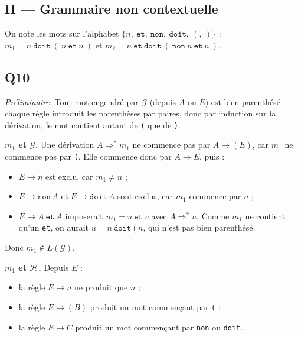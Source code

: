 \documentclass[11pt,a4paper]{article}
\providecommand{\tightlist}{\setlength{\itemsep}{0pt}\setlength{\parskip}{0pt}}
\begin{document}
\hypertarget{ii-grammaire-non-contextuelle}{%
\subsection{II --- Grammaire non contextuelle}\label{ii-grammaire-non-contextuelle}}

On note les mots sur l'alphabet \(\{n,\ \mathtt{et},\ \mathtt{non},\ \mathtt{doit},\ (,\ )\}\) : \(m_1 = n\ \mathtt{doit}\ (\ n\ \mathtt{et}\ n\ )\) et \(m_2 = n\ \mathtt{et}\ \mathtt{doit}\ (\ \mathtt{non}\ n\ \mathtt{et}\ n\ )\).

\hypertarget{q10}{%
\subsection{Q10}\label{q10}}

\emph{Préliminaire.} Tout mot engendré par \(\mathcal G\) (depuis \(A\) ou \(E\)) est bien parenthésé : chaque règle introduit les parenthèses par paires, donc par induction sur la dérivation, le mot contient autant de \texttt{(} que de \texttt{)}.

\textbf{\(m_1\) et \(\mathcal G\).} Une dérivation \(A\Rightarrow^* m_1\) ne commence pas par \(A\to(E)\), car \(m_1\) ne commence pas par \texttt{(}. Elle commence donc par \(A\to E\), puis :

\begin{itemize}
\tightlist
\item
  \(E\to n\) est exclu, car \(m_1\neq n\) ;
\item
  \(E\to\mathtt{non}\,A\) et \(E\to\mathtt{doit}\,A\) sont exclus, car \(m_1\) commence par \(n\) ;
\item
  \(E\to A\ \mathtt{et}\ A\) imposerait \(m_1=u\ \mathtt{et}\ v\) avec \(A\Rightarrow^*u\). Comme \(m_1\) ne contient qu'un \texttt{et}, on aurait \(u = n\ \mathtt{doit}\ (\ n\), qui n'est pas bien parenthésé.
\end{itemize}

Donc \textbf{\(m_1\notin L(\mathcal G)\)}.

\textbf{\(m_1\) et \(\mathcal H\).} Depuis \(E\) :

\begin{itemize}
\tightlist
\item
  la règle \(E\to n\) ne produit que \(n\) ;
\item
  la règle \(E\to(B)\) produit un mot commençant par \texttt{(} ;
\item
  la règle \(E\to C\) produit un mot commençant par \texttt{non} ou \texttt{doit}.
\end{itemize}
\end{document}
